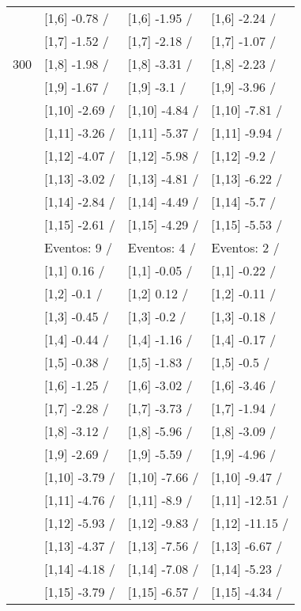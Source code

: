 \begin{table}
\begin{tabular}[t]{llll}
 & {}[1,6] -0.78  / & {}[1,6] -1.95  / & {}[1,6] -2.24  /\\
 & {}[1,7] -1.52  / & {}[1,7] -2.18  / & {}[1,7] -1.07  /\\
300 & {}[1,8] -1.98  / & {}[1,8] -3.31  / & {}[1,8] -2.23  /\\
\addlinespace
 & {}[1,9] -1.67  / & {}[1,9] -3.1  / & {}[1,9] -3.96  /\\
 & {}[1,10] -2.69  / & {}[1,10] -4.84  / & {}[1,10] -7.81  /\\
 & {}[1,11] -3.26  / & {}[1,11] -5.37  / & {}[1,11] -9.94  /\\
 & {}[1,12] -4.07  / & {}[1,12] -5.98  / & {}[1,12] -9.2  /\\
 & {}[1,13] -3.02  / & {}[1,13] -4.81  / & {}[1,13] -6.22  /\\
\addlinespace
 & {}[1,14] -2.84  / & {}[1,14] -4.49  / & {}[1,14] -5.7  /\\
 & {}[1,15] -2.61  / & {}[1,15] -4.29  / & {}[1,15] -5.53  /\\
 & Eventos:  9 / & Eventos:  4 / & Eventos:  2 /\\
 & {}[1,1] 0.16  / & {}[1,1] -0.05  / & {}[1,1] -0.22  /\\
 & {}[1,2] -0.1  / & {}[1,2] 0.12  / & {}[1,2] -0.11  /\\
\addlinespace
 & {}[1,3] -0.45  / & {}[1,3] -0.2  / & {}[1,3] -0.18  /\\
 & {}[1,4] -0.44  / & {}[1,4] -1.16  / & {}[1,4] -0.17  /\\
 & {}[1,5] -0.38  / & {}[1,5] -1.83  / & {}[1,5] -0.5  /\\
 & {}[1,6] -1.25  / & {}[1,6] -3.02  / & {}[1,6] -3.46  /\\
 & {}[1,7] -2.28  / & {}[1,7] -3.73  / & {}[1,7] -1.94  /\\
\addlinespace
500 & {}[1,8] -3.12  / & {}[1,8] -5.96  / & {}[1,8] -3.09  /\\
 & {}[1,9] -2.69  / & {}[1,9] -5.59  / & {}[1,9] -4.96  /\\
 & {}[1,10] -3.79  / & {}[1,10] -7.66  / & {}[1,10] -9.47  /\\
 & {}[1,11] -4.76  / & {}[1,11] -8.9  / & {}[1,11] -12.51  /\\
 & {}[1,12] -5.93  / & {}[1,12] -9.83  / & {}[1,12] -11.15  /\\
\addlinespace
 & {}[1,13] -4.37  / & {}[1,13] -7.56  / & {}[1,13] -6.67  /\\
 & {}[1,14] -4.18  / & {}[1,14] -7.08  / & {}[1,14] -5.23  /\\
 & {}[1,15] -3.79  / & {}[1,15] -6.57  / & {}[1,15] -4.34  /\\
\bottomrule
\end{tabular}
\end{table}
